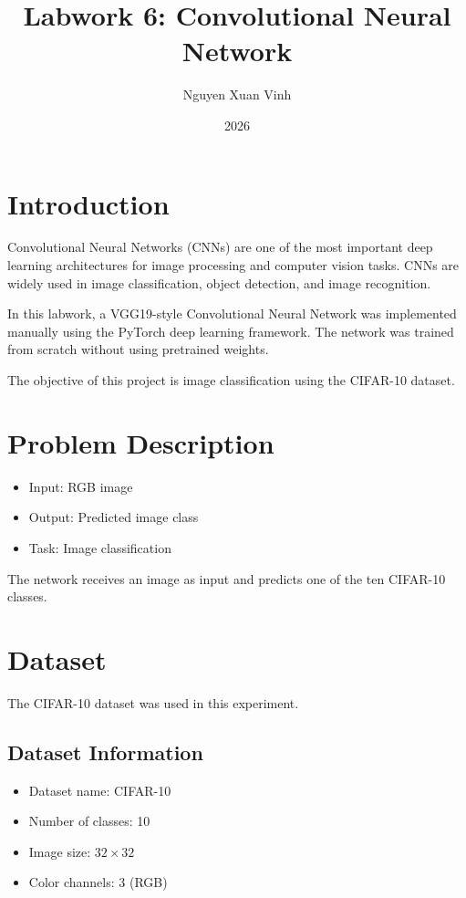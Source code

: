 \documentclass[12pt]{article}
\title{Labwork 6: Convolutional Neural Network}
\author{Nguyen Xuan Vinh}
\date{2026}
\begin{document}
\maketitle

\section{Introduction}

Convolutional Neural Networks (CNNs) are one of the most important deep learning architectures for image processing and computer vision tasks. CNNs are widely used in image classification, object detection, and image recognition.

In this labwork, a VGG19-style Convolutional Neural Network was implemented manually using the PyTorch deep learning framework. The network was trained from scratch without using pretrained weights.

The objective of this project is image classification using the CIFAR-10 dataset.

\section{Problem Description}

\begin{itemize}
    \item Input: RGB image
    \item Output: Predicted image class
    \item Task: Image classification
\end{itemize}

The network receives an image as input and predicts one of the ten CIFAR-10 classes.

\section{Dataset}

The CIFAR-10 dataset was used in this experiment.

\subsection{Dataset Information}

\begin{itemize}
    \item Dataset name: CIFAR-10
    \item Number of classes: 10
    \item Image size: $32 \times 32$
    \item Color channels: 3 (RGB)
\end{itemize}
\end{document}
